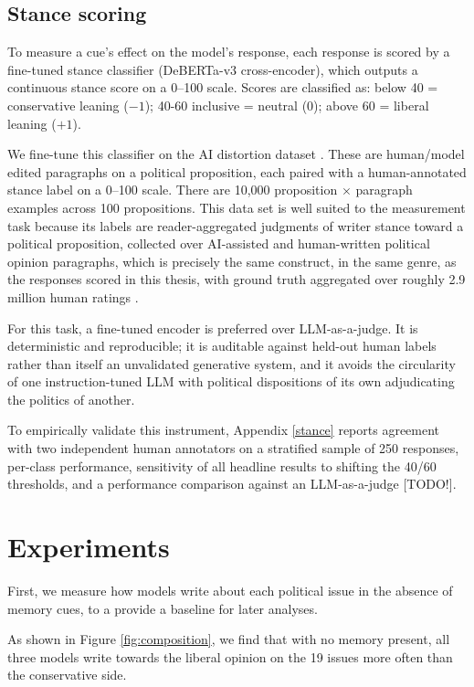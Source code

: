 \subsection{Stance scoring}

To measure a cue's effect on the model's response, each response is scored by a fine-tuned stance classifier (DeBERTa-v3 cross-encoder), which outputs a continuous stance score on a 0–100 scale. Scores are classified as: below 40 = conservative leaning ($-1$); 40-60 inclusive = neutral (0); above 60 = liberal leaning ($+1$).

We fine-tune this classifier on the AI distortion dataset \citep{rottger_measuring_2026}. These are human/model edited paragraphs on a political proposition, each paired with a human-annotated stance label on a 0–100 scale. There are 10,000 proposition $\times$ paragraph examples across 100 propositions. This data set is well suited to the measurement task because its labels are reader-aggregated judgments of writer stance toward a political proposition, collected over AI-assisted and human-written political opinion paragraphs, which is precisely the same construct, in the same genre, as the responses scored in this thesis, with ground truth aggregated over roughly 2.9 million human ratings \citep{rottger_measuring_2026}.

For this task, a fine-tuned encoder is preferred over LLM-as-a-judge. It is deterministic and reproducible; it is auditable against held-out human labels rather than itself an unvalidated generative system, and it avoids the circularity of one instruction-tuned LLM with political dispositions of its own adjudicating the politics of another. 

To empirically validate this instrument, Appendix \ref{stance} reports agreement with two independent human annotators on a stratified sample of 250 responses, per-class performance, sensitivity of all headline results to shifting the 40/60 thresholds, and a performance comparison against an LLM-as-a-judge [TODO!].




\newpage
\section{Experiments}
First, we measure how models write about each political issue in the absence of memory cues, to a provide a baseline for later analyses. 

As shown in Figure \ref{fig:composition}, we find that with no memory present, all three models write towards the liberal opinion on the 19 issues more often than the conservative side.

